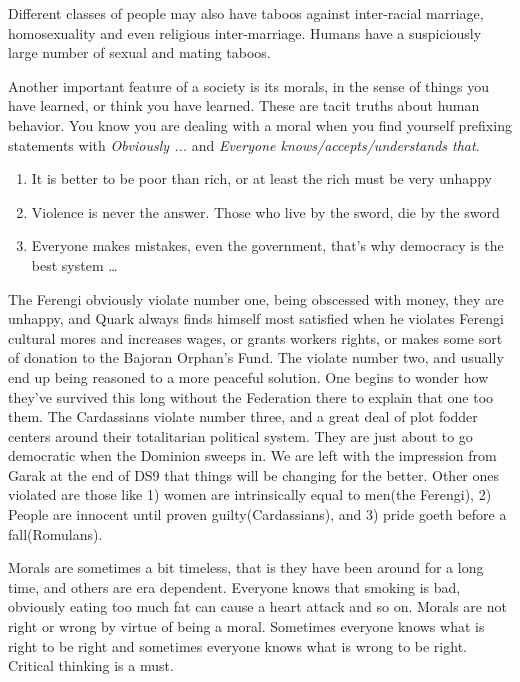 Different classes of people may also have taboos against inter-racial marriage, homosexuality and even religious inter-marriage. Humans have a suspiciously large number of sexual and mating taboos.

Another important feature of a society is its morals, in the sense of things you have learned, or think you have learned. These are tacit truths about human behavior. You know you are dealing with a moral when you find yourself prefixing statements with \textit{Obviously ...} and \textit{Everyone knows/accepts/understands that}.

\begin{enumerate}
	\item It is better to be poor than rich, or at least the rich must be very unhappy
	\item Violence is never the answer. Those who live by the sword, die by the sword
	\item Everyone makes mistakes, even the government, that's why democracy is the best system \ldots
\end{enumerate}

The Ferengi obviously violate number one, being obscessed with money, they are unhappy, and Quark always finds himself most satisfied when he violates Ferengi cultural mores and increases wages, or grants workers rights, or makes some sort of donation to the Bajoran Orphan's Fund. The \klingons violate number two, and usually end up being reasoned to a more peaceful solution. One begins to wonder how they've survived this long without the Federation there to explain that one too them. The Cardassians violate number three, and a great deal of plot fodder centers around their totalitarian political system. They are just about to go democratic when the Dominion sweeps in. We are left with the impression from Garak at the end of DS9 that things will be changing for the better. Other ones violated are those like 1) women are intrinsically equal to men(the Ferengi), 2) People are innocent until proven guilty(Cardassians), and 3) pride goeth before a fall(Romulans).

Morals are sometimes a bit timeless, that is they have been around for a long time, and others are era dependent. Everyone knows that smoking is bad, obviously eating too much fat can cause a heart attack and so on. Morals are not right or wrong by virtue of being a moral. Sometimes everyone knows what is right to be right and sometimes everyone knows what is wrong to be right. Critical thinking is a must.

